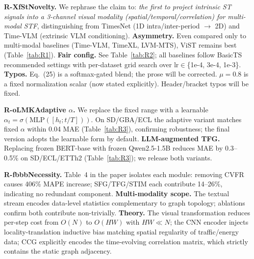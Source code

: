 \documentclass[9pt,twocolumn,letterpaper]{article}
\newcommand{\RXfSt}{\vspace{0.0em}\noindent \textcolor[RGB]{0, 123, 167}{\textbf{R-XfSt}\hspace{0.2em}}}
\newcommand{\RoLMK}{\vspace{0.0em}\noindent \textcolor[RGB]{204, 85, 0}{\textbf{R-oLMK}\hspace{0.2em}}}
\newcommand{\Rfbbb}{\vspace{0.0em}\noindent \textcolor[RGB]{0, 128, 0}{\textbf{R-fbbb}\hspace{0.2em}}}
\begin{document}
\RXfSt \textbf{Novelty.} We rephrase the claim to: \emph{the first to project intrinsic ST signals into a 3-channel visual modality (spatial/temporal/correlation) for multi-modal STF}, distinguishing from TimesNet (1D intra/inter-period $\to$ 2D) and Time-VLM (extrinsic VLM conditioning). \textbf{Asymmetry.} Even compared only to multi-modal baselines (Time-VLM, TimeXL, LVM-MTS), ViST remains best (Table~\ref{tab:R1}). \textbf{Fair config.} See Table~\ref{tab:R2}; all baselines follow BasicTS recommended settings with per-dataset grid search over lr$\in$\{1e-4, 3e-4, 1e-3\}. \textbf{Typos.} Eq.~(25) is a softmax-gated blend; the prose will be corrected. $\mu\!=\!0.8$ is a fixed normalization scalar (now stated explicitly). Header/bracket typos will be fixed.

\RoLMK \textbf{Adaptive $\alpha$.} We replace the fixed range with a learnable $\alpha_t\!=\!\sigma(\mathrm{MLP}([h_t; t/T]))$. On SD/GBA/ECL the adaptive variant matches fixed $\alpha$ within 0.04 MAE (Table~\ref{tab:R3}), confirming robustness; the final version adopts the learnable form by default. \textbf{LLM-augmented TFG.} Replacing frozen BERT-base with frozen Qwen2.5-1.5B reduces MAE by 0.3--0.5\% on SD/ECL/ETTh2 (Table~\ref{tab:R3}); we release both variants.

\begin{table}[t]
\centering
\caption{Ablation: adaptive $\alpha$ and LLM TFG (Avg MAE).}
\label{tab:R3}
\vspace{-0.5em}
\vspace{-1em}
\end{table}

\Rfbbb \textbf{Necessity.} Table~4 in the paper isolates each module: removing CVFR causes 406\% MAPE increase; SFG/TFG/STIM each contribute 14--26\%, indicating no redundant component. \textbf{Multi-modality scope.} The textual stream encodes data-level statistics complementary to graph topology; ablations confirm both contribute non-trivially. \textbf{Theory.} The visual transformation reduces per-step cost from $O(N)$ to $O(HW)$ with $HW\!\ll\!N$; the CNN encoder injects locality-translation inductive bias matching spatial regularity of traffic/energy data; CCG explicitly encodes the time-evolving correlation matrix, which strictly contains the static graph adjacency.
\end{document}
